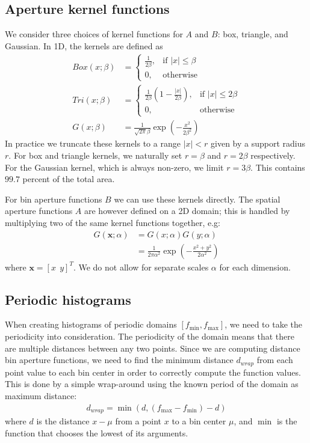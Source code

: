 \documentclass[thesis.tex]{subfiles}
\def\x{\mathbf{x}}
\begin{document}
\subsection{Aperture kernel functions}
\label{sec:apertureKernelFunctions}
%
We consider three choices of kernel functions for $A$ and $B$: box, triangle, and Gaussian. In 1D, the kernels are defined as
%
\begin{align*}
\mathit{Box} (x; \beta) &= 
\begin{cases}
    \frac{1}{2 \beta},& \text{if } |x| \leq \beta \\
    0,              & \text{otherwise}
\end{cases} \\
\mathit{Tri} (x; \beta) &= 
\begin{cases}
    \frac{1}{2 \beta} \left( 1 - \frac{| x |}{2 \beta} \right) ,& \text{if } |x| \leq 2 \beta \\
    0,              & \text{otherwise}
\end{cases} \\
G(x;\beta) &= \frac{1}{\sqrt{2\pi} \beta}
\exp\left( -\frac{x^2}{2 \beta^2} \right)
\end{align*}
%
In practice we truncate these kernels to a range $|x| < r$ given by a support radius $r$. For box and triangle kernels, we naturally set $r = \beta$ and $r = 2 \beta$ respectively. For the Gaussian kernel, which is always non-zero, we limit $r = 3 \beta$. This contains $99.7$ percent of the total area.

For bin aperture functions $B$ we can use these kernels directly. The spatial aperture functions $A$ are however defined on a 2D domain; this is handled by multiplying two of the same kernel functions together, e.g:
%
\begin{align*}
G(\x;\alpha) &= G(x;\alpha) G(y;\alpha) \\
&= \frac{1}{2\pi \alpha^2}
\exp\left( -\frac{x^2 + y^2}{2 \alpha^2} \right)
\end{align*}
%
where $\x = [x ~~ y]^T$. We do not allow for separate scales $\alpha$ for each dimension.
%
\subsection{Periodic histograms}
When creating histograms of periodic domains $[f_\text{min}, f_\text{max}]$, we need to take the periodicity into consideration.
The periodicity of the domain means that there are multiple distances between any two points. Since we are computing distance bin aperture functions, we need to find the minimum distance $d_{wrap}$ from each point value to each bin center in order to correctly compute the function values. This is done by a simple wrap-around using the known period of the domain as maximum distance:
\begin{align*}
	d_{wrap} = \min(d,(f_\text{max} - f_\text{min})-d)
\end{align*}
where $d$ is the distance $x - \mu$ from a point $x$ to a bin center $\mu$, and $\min$ is the function that chooses the lowest of its arguments.
\end{document}
